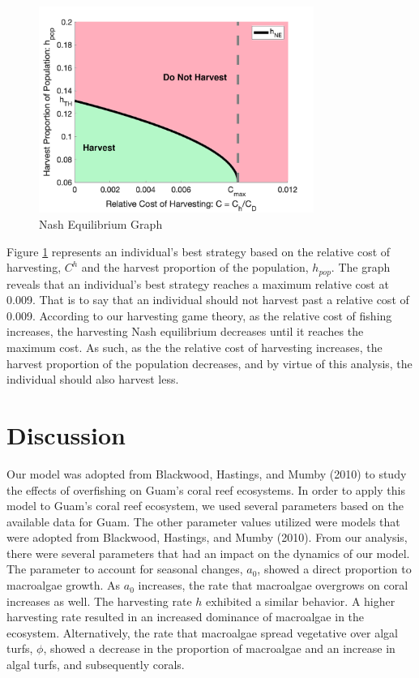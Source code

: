 \documentclass[12pt]{article}
\begin{document}
\begin{figure}[H]
    \centering
    \includegraphics[width = 0.8\textwidth] {Latex/Figures/Graphs/nash_1.png}
    \caption{Nash Equilibrium Graph}
    \label{fig:NE_Graph}
\end{figure}

Figure \ref{fig:NE_Graph} represents an individual's best strategy based on the relative cost of harvesting, $C^{h}$ and the harvest proportion of the population, $h_{pop}$. The graph reveals that an individual's best strategy reaches a maximum relative cost at 0.009. That is to say that an individual should not harvest past a relative cost of 0.009. According to our harvesting game theory, as the relative cost of fishing increases, the harvesting Nash equilibrium decreases until it reaches the maximum cost. As such, as the the relative cost of harvesting increases, the harvest proportion of the population decreases, and by virtue of this analysis, the individual should also harvest less.

\section{Discussion}
Our model was adopted from Blackwood, Hastings, and Mumby (2010) to study the effects of overfishing on Guam's coral reef ecosystems. In order to apply this model to Guam's coral reef ecosystem, we used several parameters based on the available data for Guam. The other parameter values utilized were models that were adopted from Blackwood, Hastings, and Mumby (2010). From our analysis, there were several parameters that had an impact on the dynamics of our model. The parameter to account for seasonal changes, $a_{0}$, showed a direct proportion to macroalgae growth. As $a_{0}$ increases, the rate that macroalgae overgrows on coral increases as well. The harvesting rate $h$ exhibited a similar behavior. A higher harvesting rate resulted in an increased dominance of macroalgae in the ecosystem. Alternatively,  the rate that macroalgae spread vegetative over algal turfs, $\phi$, showed a decrease in the proportion of macroalgae and an increase in algal turfs, and subsequently corals.
\end{document}
